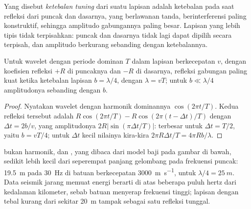 \begin{definition}\label{def:b3:exploration-seismology:resolution}
Yang disebut \emph{ketebalan tuning} dari suatu lapisan adalah ketebalan
pada saat refleksi dari puncak dan dasarnya, yang berlawanan tanda, berinterferensi
paling konstruktif, sehingga amplitudo gabungannya paling besar. Lapisan yang lebih tipis
tidak terpisahkan: puncak dan dasarnya tidak lagi dapat dipilih secara terpisah, dan
amplitudo berkurang sebanding dengan ketebalannya.
\end{definition}

\begin{proposition}\label{prop:b3:exploration-seismology:tuning}
Untuk wavelet dengan periode dominan $T$ dalam lapisan berkecepatan $v$, dengan
koefisien refleksi $+R$ di puncaknya dan $-R$ di dasarnya, refleksi gabungan
paling kuat ketika ketebalan lapisan $b = \lambda/4$, dengan $\lambda = vT$; untuk
$b \ll \lambda/4$ amplitudonya sebanding dengan $b$.
\end{proposition}

\begin{proof}
Nyatakan wavelet dengan harmonik dominannya $\cos(2\pi t/T)$. Kedua refleksi
tersebut adalah $R\cos(2\pi t/T) - R\cos(2\pi(t - \Delta t)/T)$ dengan
$\Delta t = 2b/v$, yang amplitudonya $2R|\sin(\pi\Delta t/T)|$: terbesar untuk
$\Delta t = T/2$, yaitu $b = vT/4$; untuk $\Delta t$ kecil nilainya kira-kira
$2\pi R\Delta t/T = 4\pi Rb/\lambda$.
\end{proof}

 bukan harmonik, dan , yang dibaca dari
model baji pada gambar di bawah, sedikit lebih kecil dari seperempat panjang
gelombang pada frekuensi puncak: \qty{19.5}{m} pada \qty{30}{Hz} di batuan berkecepatan
\qty{3000}{m.s^{-1}}, untuk $\lambda/4 = \qty{25}{m}$. Data seismik jarang memuat
energi berarti di atas beberapa puluh hertz dari kedalaman kilometer, sebab
batuan menyerap frekuensi tinggi; lapisan dengan tebal kurang dari sekitar \qty{20}{m}
tampak sebagai satu refleksi tunggal.

